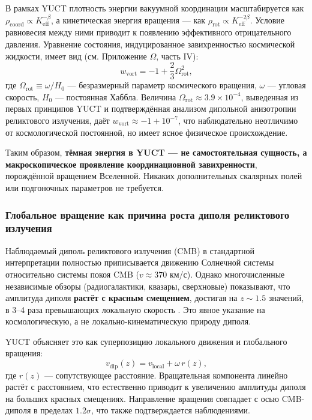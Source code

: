 \documentclass[12pt,a4paper]{article}
\begin{document}
В рамках YUCT плотность энергии вакуумной координации масштабируется как $\rho_{\mathrm{coord}} \propto K_{\mathrm{eff}}^{-\beta}$, а кинетическая энергия вращения — как $\rho_{\mathrm{rot}} \propto K_{\mathrm{eff}}^{-2\beta}$. Условие равновесия между ними приводит к появлению эффективного отрицательного давления. Уравнение состояния, индуцированное завихренностью космической жидкости, имеет вид (см. Приложение $\Omega$, часть IV):
\begin{equation}
	w_{\mathrm{vort}} = -1 + \frac{2}{3}\Omega_{\mathrm{rot}}^2,
	\label{eq:w_vort_combined}
\end{equation}
где $\Omega_{\mathrm{rot}} \equiv \omega/H_0$ — безразмерный параметр космического вращения, $\omega$ — угловая скорость, $H_0$ — постоянная Хаббла. Величина $\Omega_{\mathrm{rot}} \approx 3.9 \times 10^{-4}$, выведенная из первых принципов YUCT и подтверждённая анализом дипольной анизотропии реликтового излучения, даёт $w_{\mathrm{vort}} \approx -1 + 10^{-7}$, что наблюдательно неотличимо от космологической постоянной, но имеет ясное физическое происхождение.

Таким образом, \textbf{тёмная энергия в YUCT — не самостоятельная сущность, а макроскопическое проявление координационной завихренности}, порождённой вращением Вселенной. Никаких дополнительных скалярных полей или подгоночных параметров не требуется.

\subsubsection{Глобальное вращение как причина роста диполя реликтового излучения}

Наблюдаемый диполь реликтового излучения (CMB) в стандартной интерпретации полностью приписывается движению Солнечной системы относительно системы покоя CMB ($v \approx 370$ км/с). Однако многочисленные независимые обзоры (радиогалактики, квазары, сверхновые) показывают, что амплитуда диполя \textbf{растёт с красным смещением}, достигая на $z \sim 1.5$ значений, в 3–4 раза превышающих локальную скорость \cite{Secrest2025, Singal2024}. Это явное указание на космологическую, а не локально-кинематическую природу диполя.

YUCT объясняет это как суперпозицию локального движения и глобального вращения:
\begin{equation}
	v_{\mathrm{dip}}(z) = v_{\mathrm{local}} + \omega \, r(z),
\end{equation}
где $r(z)$ — сопутствующее расстояние. Вращательная компонента линейно растёт с расстоянием, что естественно приводит к увеличению амплитуды диполя на больших красных смещениях. Направление вращения совпадает с осью CMB-диполя в пределах $1.2\sigma$, что также подтверждается наблюдениями.
\end{document}
